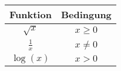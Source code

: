\documentclass[../../main.tex]{subfiles}
\begin{document}
    
\begin{tabular}{cc}
    \toprule
    \textbf{Funktion} & \textbf{Bedingung}\\
    \midrule
    $\sqrt{x}$ & $x\geq 0$\\
    $\frac{1}{x}$ & $x\neq 0$\\
    $\log(x)$ & $x>0$
\end{tabular}
\end{document}
